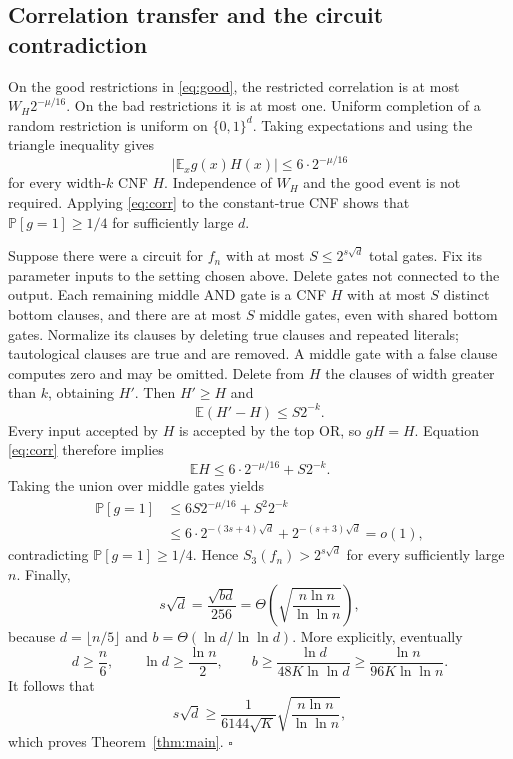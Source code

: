 \documentclass[11pt,letterpaper]{article}
\theoremstyle{definition}
\numberwithin{equation}{section}
\newcommand{\E}{\mathbb E}
\newcommand{\Prb}{\mathbb P}
\newcommand{\bits}{\{0,1\}}
\begin{document}
\subsection{Correlation transfer and the circuit contradiction}

On the good restrictions in \eqref{eq:good}, the restricted correlation
is at most $W_H2^{-\mu/16}$. On the bad restrictions it is at most one.
Uniform completion of a random restriction is uniform on $\bits^d$.
Taking expectations and using the triangle inequality gives
\begin{equation}\label{eq:corr}
 |\E_x g(x)H(x)|\le6\cdot2^{-\mu/16}
\end{equation}
for every width-$k$ CNF $H$. Independence of $W_H$ and the good event
is not required. Applying \eqref{eq:corr} to the constant-true CNF
shows that $\Prb[g=1]\ge1/4$ for sufficiently large $d$.

Suppose there were a circuit for $f_n$ with at most $S\le2^{s\sqrt d}$
total gates. Fix its parameter inputs to the setting chosen above.
Delete gates not connected to the output. Each remaining middle AND gate
is a CNF $H$ with at most $S$ distinct bottom clauses, and there are at
most $S$ middle gates, even with shared bottom gates. Normalize its clauses
by deleting true clauses and repeated literals; tautological clauses are
true and are removed. A middle gate with a false clause computes zero
and may be omitted.
Delete from $H$ the clauses of width greater than $k$, obtaining $H'$.
Then $H'\ge H$ and
\[
 \E(H'-H)\le S2^{-k}.
\]
Every input accepted by $H$ is accepted by the top OR, so $gH=H$.
Equation \eqref{eq:corr} therefore implies
\[
 \E H\le6\cdot2^{-\mu/16}+S2^{-k}.
\]
Taking the union over middle gates yields
\begin{align*}
 \Prb[g=1]
 &\le6S2^{-\mu/16}+S^2 2^{-k}\\
 &\le6\cdot2^{-(3s+4)\sqrt d}
             +2^{-(s+3)\sqrt d}=o(1),
\end{align*}
contradicting $\Prb[g=1]\ge1/4$.
Hence $S_3(f_n)>2^{s\sqrt d}$ for every sufficiently large $n$.
Finally,
\[
s\sqrt d=\frac{\sqrt{bd}}{256}
       =\Theta\!\left(\sqrt{\frac{n\ln n}{\ln\ln n}}\right),
\]
because $d=\lfloor n/5\rfloor$ and
$b=\Theta(\ln d/\ln\ln d)$. More explicitly, eventually
\[
 d\ge\frac n6,\qquad \ln d\ge\frac{\ln n}{2},\qquad
 b\ge\frac{\ln d}{48K\ln\ln d}
   \ge\frac{\ln n}{96K\ln\ln n}.
\]
It follows that
\[
 s\sqrt d\ge\frac1{6144\sqrt K}
                 \sqrt{\frac{n\ln n}{\ln\ln n}},
\]
which proves Theorem~\ref{thm:main}. \hfill$\square$
\end{document}
